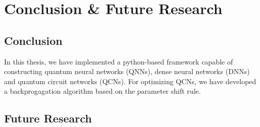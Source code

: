 \chapter{Conclusion \& Future Research}\label{chap:Conclusion}

\section{Conclusion}\label{sec:conclusion}
In this thesis, we have implemented a python-based framework capable of constructing quantum neural networks (QNNs), dense neural networks (DNNs) and quantum circuit networks (QCNs). For optimizing QCNs, we have developed a backprogagation algorithm based on the parameter shift rule. 

\section{Future Research}\label{sec:future}



